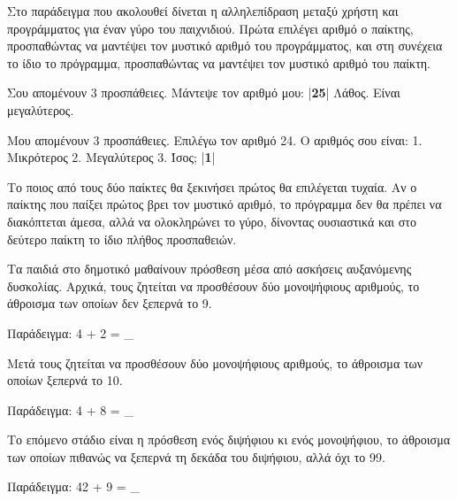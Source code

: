 \documentclass[a4paper,11pt,oneside]{book}
\begin{document}
{{{\begin{exercise}
Στο παράδειγμα που ακολουθεί δίνεται η αλληλεπίδραση μεταξύ χρήστη και προγράμματος για έναν γύρο του παιχνιδιού. Πρώτα επιλέγει αριθμό ο παίκτης, προσπαθώντας να μαντέψει τον μυστικό αριθμό του προγράμματος, και στη συνέχεια το ίδιο το πρόγραμμα, προσπαθώντας να μαντέψει τον μυστικό αριθμό του παίκτη.

\begin{pyterm}
Σου απομένουν 3 προσπάθειες.
Μάντεψε τον αριθμό μου: |\textbf{25}|
Λάθος. Είναι μεγαλύτερος.

Μου απομένουν 3 προσπάθειες.
Επιλέγω τον αριθμό 24. Ο αριθμός σου είναι: 
1. Μικρότερος 2. Μεγαλύτερος 3. Ίσος; |\textbf{1}|
\end{pyterm}

Το ποιος από τους δύο παίκτες θα ξεκινήσει πρώτος θα επιλέγεται τυχαία. Αν ο παίκτης που παίξει πρώτος βρει τον μυστικό αριθμό, το πρόγραμμα δεν θα πρέπει να διακόπτεται άμεσα, αλλά να ολοκληρώνει το γύρο, δίνοντας ουσιαστικά και στο δεύτερο παίκτη το ίδιο πλήθος προσπαθειών.
\end{exercise}

\begin{exercise}
Τα παιδιά στο δημοτικό μαθαίνουν πρόσθεση μέσα από ασκήσεις αυξανόμενης δυσκολίας. Αρχικά, τους ζητείται να προσθέσουν δύο μονοψήφιους αριθμούς, το άθροισμα των οποίων δεν ξεπερνά το 9. 

\begin{note}
Παράδειγμα: 4 + 2 = \_
\end{note}



Μετά τους ζητείται να προσθέσουν δύο μονοψήφιους αριθμούς, το άθροισμα των οποίων ξεπερνά το 10. 

\begin{note}
Παράδειγμα: 4 + 8 = \_
\end{note}

Το επόμενο στάδιο είναι η πρόσθεση ενός διψήφιου κι ενός μονοψήφιου, το άθροισμα των οποίων πιθανώς να ξεπερνά τη δεκάδα του διψήφιου, αλλά όχι το 99.

\begin{note}
Παράδειγμα: 42 + 9 = \_
\end{note}


\end{exercise}}}}
\end{document}

